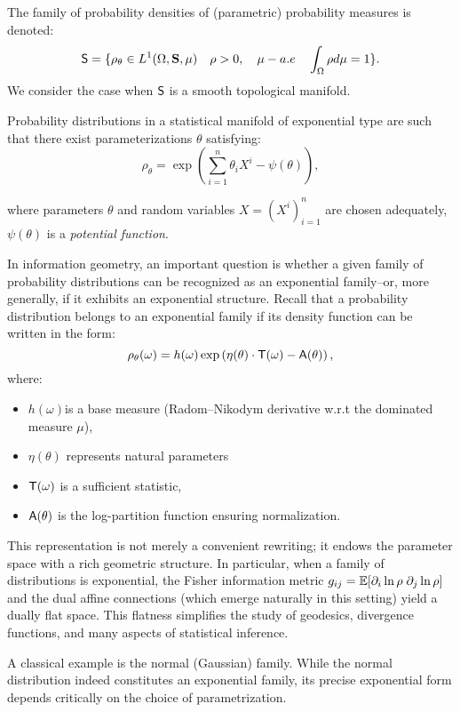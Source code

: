 {The family of probability densities of (parametric) probability measures is denoted: 
\[\mathsf{S}= \{\rho_\theta \in L^1(\Omega, \mathbf{S},\mu) \quad \rho>0, \quad \mu - a.e \quad \int_{\Omega}\rho d\mu=1\}.\]
We consider the case when $\mathsf{S}$ is a smooth topological manifold.

Probability distributions in a statistical manifold of exponential type are such that there exist parameterizations $\theta$ satisfying:
\[
\rho_\theta = \exp \left( \sum_{i=1}^n \theta_i X^i- \psi (\theta)\right),
\]

where parameters $\theta$ and random variables $X=(X^i)_{i=1}^n$ are chosen adequately,
$\psi(\theta)$ is a \emph{potential function}. 


In information geometry, an important question is whether a given family of probability distributions can be recognized as an exponential family--or, more generally, if it exhibits an exponential structure. Recall that a probability distribution belongs to an exponential family if its density function can be written in the form:
\[\rho_\theta(\omega)=h(\omega)\exp\left( \eta(\theta)\cdot \mathsf{T}(\omega)-\mathsf{A}(\theta)\right),\]
where: 

\begin{itemize}
    \item $h(\omega)$is a base measure (Radom--Nikodym derivative w.r.t the dominated measure $\mu$),
    \item $\eta(\theta)$ represents natural parameters
    \item $\mathsf{T}(\omega)$ is a sufficient statistic,
    \item $\mathsf{A}(\theta)$ is the log-partition function ensuring normalization.
\end{itemize}

\vspace{5pt}
This representation is not merely a convenient rewriting; it endows the parameter space with a rich geometric structure. 
In particular, when a family of distributions is exponential, the Fisher information metric
 $g_{ij}=\mathbb{E}[ \partial_i \ln \rho \; \partial_j \ln \rho]$ and the dual affine connections
(which emerge naturally in this setting) yield a dually flat space. This flatness simplifies the study of geodesics, divergence functions, and many aspects of statistical inference.

A classical example is the normal (Gaussian) family. 
While the normal distribution indeed constitutes an exponential family, its precise exponential form depends critically on the choice of parametrization. 

}
